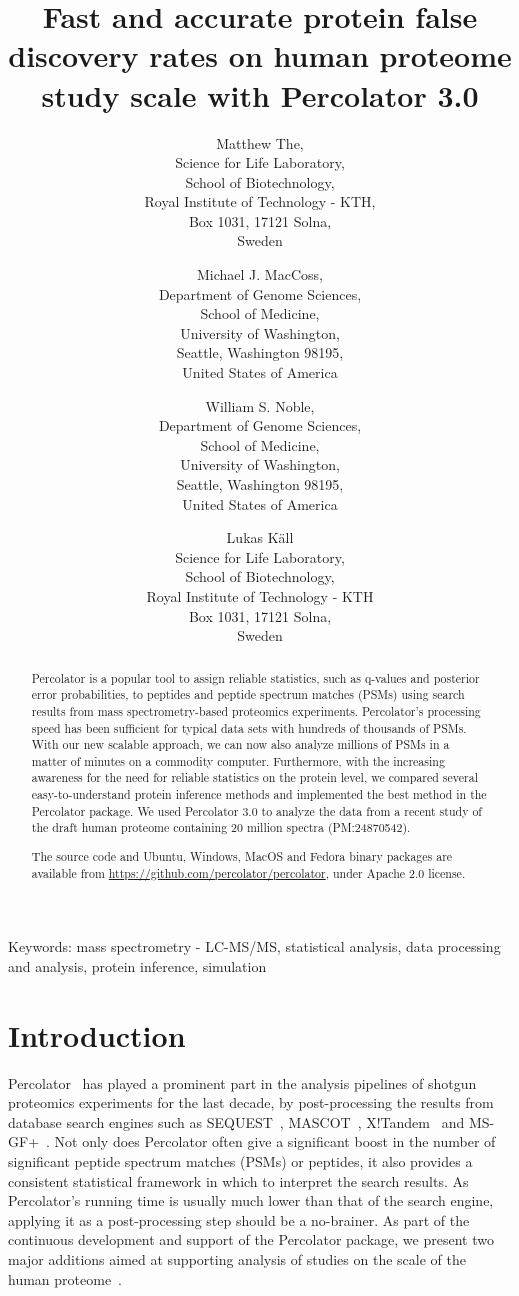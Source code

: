 \documentclass{article}
\title{Fast and accurate protein false discovery rates on human
proteome study scale with Percolator 3.0}
\author{Matthew The,\\
Science for Life Laboratory,\\
School of Biotechnology,\\
Royal Institute of Technology - KTH,\\
Box 1031, 17121 Solna,\\ Sweden
\and 
Michael J. MacCoss,\\
Department of Genome Sciences,\\
School of Medicine,\\
University of Washington,\\
Seattle, Washington 98195,\\ United States of America
\and 
William S. Noble,\\
Department of Genome Sciences,\\
School of Medicine,\\
University of Washington,\\
Seattle, Washington 98195,\\ United States of America
\and
Lukas K\"{a}ll\\
Science for Life Laboratory,\\ School of Biotechnology,\\
Royal Institute of Technology - KTH\\ 
Box 1031, 17121 Solna,\\ Sweden}
\begin{document}
\maketitle

\doublespacing

Keywords: mass spectrometry - LC-MS/MS, statistical analysis, 
data processing and analysis, protein inference, simulation


\newpage

\begin{abstract} 
Percolator is a popular tool to assign reliable statistics, such as
q-values and posterior error probabilities, to peptides and peptide
spectrum matches (PSMs) using search results from mass
spectrometry-based proteomics experiments. Percolator's processing
speed has been sufficient for typical data sets with hundreds of
thousands of PSMs. With our new scalable approach, we can now also
analyze millions of PSMs in a matter of minutes on a commodity
computer. Furthermore, with the increasing awareness for the need for
reliable statistics on the protein level, we compared several
easy-to-understand protein inference methods and implemented the best
method in the Percolator package. We used Percolator 3.0 to analyze
the data from a recent study of the draft human proteome containing 20
million spectra (PM:24870542).

The source code and Ubuntu, Windows, MacOS and Fedora binary packages
are available from \url{https://github.com/percolator/percolator},
under Apache 2.0 license.
\end{abstract}

\newpage

\section*{Introduction}

Percolator~\cite{kall2007} has played a prominent part in the analysis
pipelines of shotgun proteomics experiments for the last decade, by
post-processing the results from database search engines such as
SEQUEST~\cite{eng1994}, MASCOT~\cite{cottrell1999},
X!Tandem~\cite{craig2004tandem} and MS-GF+~\cite{kim2008}. Not only
does Percolator often give a significant boost in the number of
significant peptide spectrum matches (PSMs) or peptides, it also
provides a consistent statistical framework in which to interpret the
search results. As Percolator's running time is usually much lower
than that of the search engine, applying it as a post-processing step
should be a no-brainer. As part of the continuous development and
support of the Percolator package, we present two major additions
aimed at supporting analysis of studies on the scale of the human
proteome~\cite{kim2014draft, wilhelm2014mass}.
\end{document}
